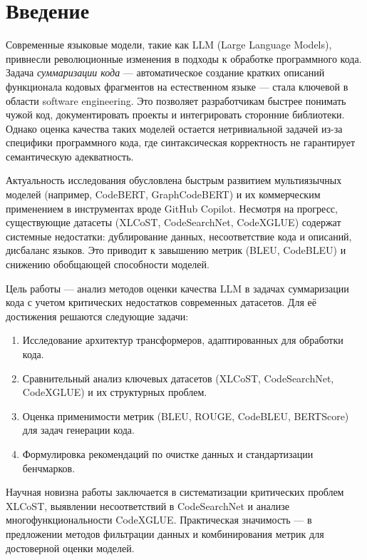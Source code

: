 \documentclass[14pt]{article}
\theoremstyle{definition}
\begin{document}
\pagebreake[2]


\newpage
\tableofcontents
\newpage
\section{Введение}

Современные языковые модели, такие как LLM (Large Language Models), привнесли революционные изменения в подходы к обработке программного кода. Задача \textit{суммаризации кода} — автоматическое создание кратких описаний функционала кодовых фрагментов на естественном языке — стала ключевой в области software engineering. Это позволяет разработчикам быстрее понимать чужой код, документировать проекты и интегрировать сторонние библиотеки. Однако оценка качества таких моделей остается нетривиальной задачей из-за специфики программного кода, где синтаксическая корректность не гарантирует семантическую адекватность.

Актуальность исследования обусловлена быстрым развитием мультиязычных моделей (например, CodeBERT, GraphCodeBERT) и их коммерческим применением в инструментах вроде GitHub Copilot. Несмотря на прогресс, существующие датасеты (XLCoST, CodeSearchNet, CodeXGLUE) содержат системные недостатки: дублирование данных, несоответствие кода и описаний, дисбаланс языков. Это приводит к завышению метрик (BLEU, CodeBLEU) и снижению обобщающей способности моделей.

Цель работы — анализ методов оценки качества LLM в задачах суммаризации кода с учетом критических недостатков современных датасетов. Для её достижения решаются следующие задачи:
\begin{enumerate}
    \item Исследование архитектур трансформеров, адаптированных для обработки кода.
    \item Сравнительный анализ ключевых датасетов (XLCoST, CodeSearchNet, CodeXGLUE) и их структурных проблем.
    \item Оценка применимости метрик (BLEU, ROUGE, CodeBLEU, BERTScore) для задач генерации кода.
    \item Формулировка рекомендаций по очистке данных и стандартизации бенчмарков.
\end{enumerate}

Научная новизна работы заключается в систематизации критических проблем XLCoST, выявлении несоответствий в CodeSearchNet и анализе многофункциональности CodeXGLUE. Практическая значимость — в предложении методов фильтрации данных и комбинирования метрик для достоверной оценки моделей.
\end{document}
